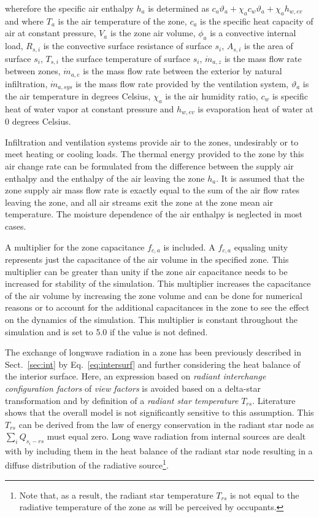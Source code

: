 wherefore the specific air enthalpy $h_{a}$ is determined as $c_{a}\vartheta_{a}+\chi_{a} c_{w}\vartheta_{a} + \chi_{a} h_{w,ev}$ and where $T_{a}$ is the air temperature of the zone, $c_{a}$ is the specific heat capacity of air at constant pressure, $V_{a}$ is the zone air volume, $\phi_{a}$ is a convective internal load, $R_{s,i}$ is the convective surface resistance of surface $s_{i}$, $A_{s,i}$ is the area of surface $s_{i}$, $T_{s,i}$ the surface temperature of surface $s_{i}$, $\dot{m}_{a,z}$ is the mass flow rate between zones, $\dot{m}_{a,e}$ is the mass flow rate between the exterior by natural infiltration, $\dot{m}_{a,sys}$ is the mass flow rate provided by the ventilation system, $\vartheta_{a}$ is the air temperature in degrees Celsius, $\chi_{a}$ is the air humidity ratio, $c_{w}$ is specific heat of water vapor at constant pressure and $h_{w,ev}$ is evaporation heat of water at 0 degrees Celsius. 

Infiltration and ventilation systems provide air to the zones, undesirably or to meet heating or cooling loads. The thermal energy provided to the zone by this air change rate can be formulated from the difference between the supply air enthalpy and the enthalpy of the air leaving the zone $h_{a}$. It is assumed that the zone supply air mass flow rate is exactly equal to the sum of the air flow rates leaving the zone, and all air streams exit the zone at the zone mean air temperature. The moisture dependence of the air enthalpy is neglected in most cases.

A multiplier for the zone capacitance $f_{c,a}$ is included. A $f_{c,a}$ equaling unity represents just the capacitance of the air volume in the specified zone. This multiplier can be greater than unity if the zone air capacitance needs to be increased for stability of the simulation. This multiplier increases the capacitance of the air volume by increasing the zone volume and can be done for numerical reasons or to account for the additional capacitances in the zone to see the effect on the dynamics of the simulation. This multiplier is constant throughout the
simulation and is set to 5.0 if the value is not defined. %

 The exchange of longwave radiation in a zone has been previously described in Sect.~\ref{sec:int} by Eq.~\ref{eq:intersurf} and further considering the heat balance of the interior surface. Here, an expression based on \emph{radiant interchange configuration factors} of \emph{view factors} is avoided based on a delta-star transformation and by definition of a \emph{radiant star temperature} $T_{rs}$. Literature~\cite{Liesen1997} shows that the overall model is not significantly sensitive to this assumption. This $T_{rs}$ can be derived from the law of energy conservation in the radiant star node as $\sum_{i}Q_{s_{i}-rs}$ must equal zero. Long wave radiation from internal sources are dealt with by including them in the heat balance of the radiant star node resulting in a diffuse distribution of the radiative source\footnote{Note that, as a result, the radiant star temperature $T_{rs}$ is not equal to the radiative temperature of the zone as will be perceived by occupants.}.

